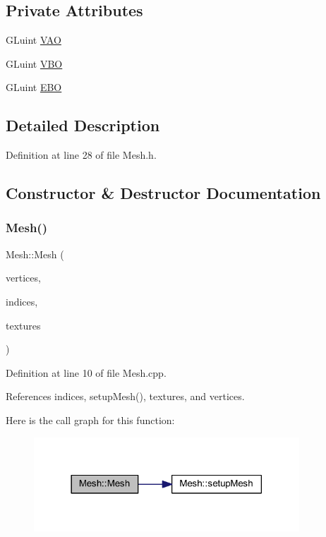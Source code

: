 \subsection*{Private Attributes}
\begin{DoxyCompactItemize}
\item 
G\+Luint \mbox{\hyperlink{classMesh_a09b989b9d4df8ae595d7e80e091a4a5b}{V\+AO}}
\item 
G\+Luint \mbox{\hyperlink{classMesh_a0d28b2c6fee628a13f43cae3f858569b}{V\+BO}}
\item 
G\+Luint \mbox{\hyperlink{classMesh_a894c6723c0172f4e38b2509582abfa6c}{E\+BO}}
\end{DoxyCompactItemize}


\subsection{Detailed Description}


Definition at line 28 of file Mesh.\+h.



\subsection{Constructor \& Destructor Documentation}
\mbox{\label{classMesh_af1baf95f510199fd2b3631e9daae79ce}} 
\subsubsection{\texorpdfstring{Mesh()}{Mesh()}}
{\footnotesize\ttfamily Mesh\+::\+Mesh (\begin{DoxyParamCaption}\item[{std\+::vector$<$ \mbox{\hyperlink{structVertex}{Vertex}} $>$}]{vertices,  }\item[{std\+::vector$<$ G\+Luint $>$}]{indices,  }\item[{std\+::vector$<$ \mbox{\hyperlink{structTexture}{Texture}} $>$}]{textures }\end{DoxyParamCaption})}



Definition at line 10 of file Mesh.\+cpp.



References indices, setup\+Mesh(), textures, and vertices.

Here is the call graph for this function\+:
\nopagebreak
\begin{figure}[H]
\begin{center}
\leavevmode
\includegraphics[width=282pt]{classMesh_af1baf95f510199fd2b3631e9daae79ce_cgraph}
\end{center}
\end{figure}


